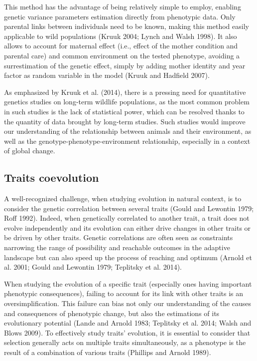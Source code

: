 \documentclass[
  12pt,
  letterpaper,
]{scrartcl}
\begin{document}
This method has the advantage of being relatively simple to employ,
enabling genetic variance parameters estimation directly from phenotypic
data. Only parental links between individuals need to be known, making
this method easily applicable to wild populations (Kruuk 2004; Lynch and
Walsh 1998). It also allows to account for maternal effect (i.e., effect
of the mother condition and parental care) and common environment on the
tested phenotype, avoiding a surrestimation of the genetic effect,
simply by adding mother identity and year factor as random variable in
the model (Kruuk and Hadfield 2007).

As emphasized by Kruuk et al. (2014), there is a pressing need for
quantitative genetics studies on long-term wildlife populations, as the
most common problem in such studies is the lack of statistical power,
which can be resolved thanks to the quantity of data brought by
long-term studies. Such studies would improve our understanding of the
relationship between animals and their environment, as well as the
genotype-phenotype-environment relationship, especially in a context of
global change.

\subsection{Traits coevolution}\label{traits-coevolution}

A well-recognized challenge, when studying evolution in natural context,
is to consider the genetic correlation between several traits (Gould and
Lewontin 1979; Roff 1992). Indeed, when genetically correlated to
another trait, a trait does not evolve independently and its evolution
can either drive changes in other traits or be driven by other traits.
Genetic correlations are often seen as constraints narrowing the range
of possibility and reachable outcomes in the adaptive landscape but can
also speed up the process of reaching and optimum (Arnold et al. 2001;
Gould and Lewontin 1979; Teplitsky et al. 2014).

When studying the evolution of a specific trait (especially ones having
important phenotypic consequences), failing to account for its link with
other traits is an oversimplification. This failure can bias not only
our understanding of the causes and consequences of phenotypic change,
but also the estimations of its evolutionary potential (Lande and Arnold
1983; Teplitsky et al. 2014; Walsh and Blows 2009). To effectively study
traits' evolution, it is essential to consider that selection generally
acts on multiple traits simultaneously, as a phenotype is the result of
a combination of various traits (Phillips and Arnold 1989).
\end{document}
